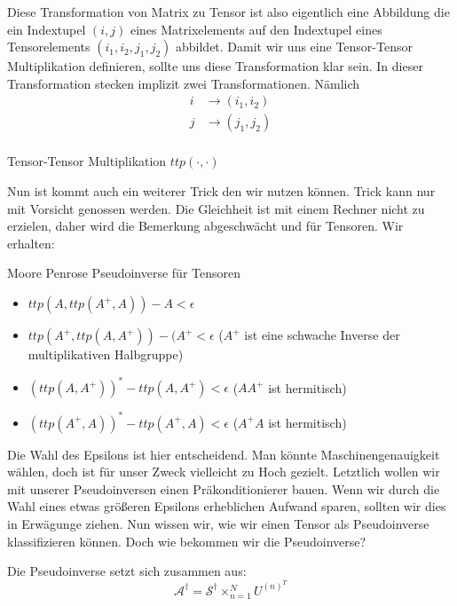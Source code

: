 Diese Transformation von Matrix zu Tensor ist also eigentlich eine Abbildung die ein Indextupel $(i,j)$ eines Matrixelements auf den Indextupel eines Tensorelements $(i_1,i_2,j_1,j_2)$ abbildet. Damit wir uns eine Tensor-Tensor Multiplikation definieren, sollte uns diese Transformation klar sein.
In dieser Transformation stecken implizit zwei Transformationen. Nämlich
\begin{equation*}
\begin{aligned}
i &\rightarrow (i_1,i_2) \\
j &\rightarrow (j_1,j_2) \\
\end{aligned}
\end{equation*}

\begin{Definition} Tensor-Tensor Multiplikation $ttp(\cdot,\cdot)$

\end{Definition}

Nun ist kommt auch ein weiterer Trick den wir nutzen können. Trick kann nur mit Vorsicht genossen werden. Die Gleichheit ist mit einem Rechner nicht zu erzielen, daher wird die Bemerkung abgeschwächt und für Tensoren. Wir erhalten:
\begin{Lemma} Moore Penrose Pseudoinverse für Tensoren 
\begin{itemize}
\item $ttp(A,ttp(A^{+},A))-A < \epsilon$
\item $ttp(A^{+},ttp(A,A^{+}))-(A^{+}< \epsilon $ ($A^{+}$ ist eine schwache Inverse der multiplikativen Halbgruppe)
\item $(ttp(A,A^{+}))^{*}-ttp(A,A^{+}) < \epsilon $ ($AA^{+}$ ist hermitisch)
\item $(ttp(A^{+},A))^{*}-ttp(A^{+},A) < \epsilon $ ($A^{+}A$ ist hermitisch)
\end{itemize}
\end{Lemma}

Die Wahl des Epsilons ist hier entscheidend. Man könnte Maschinengenauigkeit wählen, doch ist für unser Zweck vielleicht zu Hoch gezielt. Letztlich wollen wir mit unserer Pseudoinversen einen Präkonditionierer bauen. Wenn wir durch die Wahl eines etwas größeren Epsilons erheblichen Aufwand sparen, sollten wir dies in Erwägunge ziehen.
Nun wissen wir, wie wir einen Tensor als Pseudoinverse klassifizieren können. Doch wie bekommen wir die Pseudoinverse?

Die Pseudoinverse setzt sich zusammen aus:
\begin{equation} \label{eq:pinv}
\mathcal{A}^{\dagger} = \mathcal{S}^{\dagger} \times_{n=1}^{N} U^{ (n) ^{T} }
\end{equation}

